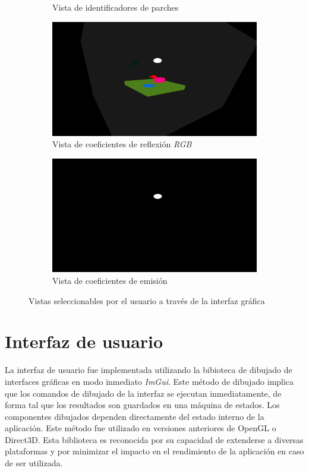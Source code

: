 \begin{figure}[H]
\begin{subfigure}{0.4\textwidth}
		\caption{Vista de identificadores de parches}
	\end{subfigure}
	\begin{subfigure}{0.4\textwidth}
		\includegraphics[width=1\linewidth]{assets/display-view(2)}
		\caption{Vista de coeficientes de reflexión \textit{RGB}}
	\end{subfigure}
	\begin{subfigure}{0.4\textwidth}
		\includegraphics[width=1\linewidth]{assets/display-view(5)}
		\caption{Vista de coeficientes de emisión}
	\end{subfigure}
	\caption{Vistas seleccionables por el usuario a través de la interfaz gráfica}
	\label{img:displayed}
\end{figure}

\section {Interfaz de usuario}

La interfaz de usuario fue implementada utilizando la bibioteca de dibujado de interfaces gráficas en modo inmediato \textit{ImGui}. Este método de dibujado implica que los comandos de dibujado de la interfaz se ejecutan inmediatamente, de forma tal que los resultados son guardados en una máquina de estados. Los componentes dibujados dependen directamente del estado interno de la aplicación. Este método fue utilizado en versiones anteriores de OpenGL o Direct3D. Esta biblioteca es reconocida por su capacidad de extenderse a diversas plataformas y por minimizar el impacto en el rendimiento de la aplicación en caso de ser utilizada.

